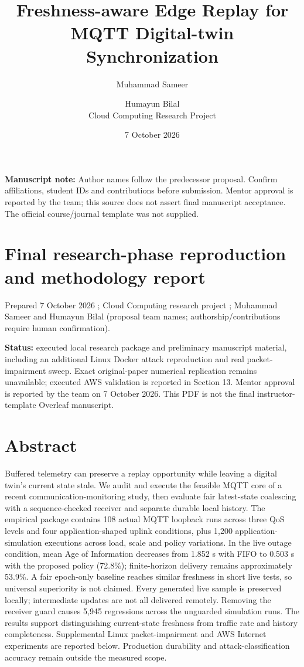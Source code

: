 \documentclass[11pt,a4paper]{article}
\title{Freshness-aware Edge Replay for MQTT Digital-twin Synchronization}
\author{Muhammad Sameer \and Humayun Bilal\\\small Cloud Computing Research Project}
\date{7 October 2026}
\begin{document}
\maketitle
\noindent\textbf{Manuscript note:} Author names follow the predecessor proposal. Confirm affiliations, student IDs and contributions before submission. Mentor approval is reported by the team; this source does not assert final manuscript acceptance. The official course/journal template was not supplied.

\section{Final research-phase reproduction and methodology report}

Prepared 7 October 2026 ;  Cloud Computing research project ;  Muhammad Sameer and Humayun Bilal (proposal team names; authorship/contributions require human confirmation).


\textbf{Status:} executed local research package and preliminary manuscript material, including an additional Linux Docker attack reproduction and real packet-impairment sweep. Exact original-paper numerical replication remains unavailable; executed AWS validation is reported in Section 13. Mentor approval is reported by the team on 7 October 2026. This PDF is not the final instructor-template Overleaf manuscript.


\section{Abstract}

Buffered telemetry can preserve a replay opportunity while leaving a digital twin's current state stale. We audit and execute the feasible MQTT core of a recent communication-monitoring study, then evaluate fair latest-state coalescing with a sequence-checked receiver and separate durable local history. The empirical package contains 108 actual MQTT loopback runs across three QoS levels and four application-shaped uplink conditions, plus 1,200 application-simulation executions across load, scale and policy variations. In the live outage condition, mean Age of Information decreases from 1.852 s with FIFO to 0.503 s with the proposed policy (72.8\%); finite-horizon delivery remains approximately 53.9\%. A fair epoch-only baseline reaches similar freshness in short live tests, so universal superiority is not claimed. Every generated live sample is preserved locally; intermediate updates are not all delivered remotely. Removing the receiver guard causes 5,945 regressions across the unguarded simulation runs. The results support distinguishing current-state freshness from traffic rate and history completeness. Supplemental Linux packet-impairment and AWS Internet experiments are reported below. Production durability and attack-classification accuracy remain outside the measured scope.
\end{document}
